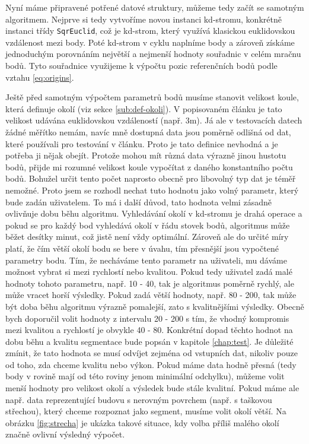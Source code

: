 \documentclass[11pt,twoside,a4paper]{book}
\begin{document}
Nyní máme připravené potřené datové struktury, můžeme tedy začít se samotným algoritmem. Nejprve si tedy vytvoříme novou instanci kd-stromu, konkrétně instanci třídy \verb|SqrEuclid|, což je kd-strom, který využívá klasickou euklidovskou vzdálenost mezi body. Poté kd-strom  v cyklu naplníme body a zároveň získáme jednoduchým porovnáním  největší a nejmenší hodnoty souřadnic v celém mračnu bodů. Tyto souřadnice využijeme k výpočtu pozic referenčních bodů podle vztahu \ref{eq:origins}.

Ještě před samotným výpočtem parametrů bodů musíme stanovit velikost koule, která definuje okolí (viz sekce \ref{sub:def-okoli}). V popisovaném článku je tato velikost udávána euklidovskou vzdáleností (např. 3m). Já ale v testovacích datech žádné měřítko nemám, navíc mně dostupná data jsou poměrně odlišná od dat, které používali pro testování v článku. Proto je tato definice nevhodná a je potřeba ji nějak obejít. Protože mohou mít různá data výrazně jinou hustotu bodů, přijde mi rozumné velikost koule vypočítat z daného konstantního počtu bodů. Bohužel určit tento počet naprosto obecně pro libovolný typ dat je téměř nemožné. Proto jsem se rozhodl nechat tuto hodnotu jako volný parametr, který bude zadán uživatelem. To má i další důvod, tato hodnota velmi zásadně ovlivňuje dobu běhu algoritmu. Vyhledávání okolí v kd-stromu je drahá operace a pokud se pro každý bod vyhledává okolí v řádu stovek bodů, algoritmus může běžet desítky minut, což jistě není vždy optimální. Zároveň ale do určité míry platí, že čím větší okolí bodu se bere v úvahu, tím přesnější jsou vypočtené parametry bodu. Tím, že necháváme tento parametr na uživateli, mu dáváme možnost vybrat si mezi rychlostí nebo kvalitou. Pokud tedy uživatel zadá malé hodnoty tohoto parametru, např. 10 - 40, tak je algoritmus poměrně rychlý, ale může vracet horší výsledky. Pokud zadá větší hodnoty, např. 80 - 200, tak může být doba běhu algoritmu výrazně pomalejší, zato s kvalitnějšími výsledky. Obecně bych doporučil volit hodnoty z intervalu 20 - 200 s tím, že vhodný kompromis mezi kvalitou a rychlostí je obvykle 40 - 80. Konkrétní dopad těchto hodnot na dobu běhu a kvalitu segmentace bude popsán v kapitole \ref{chap:test}. Je důležité zmínit, že tato hodnota se musí odvíjet zejména od vstupních dat, nikoliv pouze od toho, zda chceme kvalitu nebo výkon. Pokud máme data hodně přesná (tedy body v rovině mají od této roviny jenom minimální odchylku), můžeme volit menší hodnoty pro velikost okolí a výsledek bude stále kvalitní. Pokud máme ale např. data reprezentující budovu s nerovným povrchem (např. s taškovou střechou), který chceme rozpoznat jako segment, musíme volit okolí větší. Na obrázku \ref{fig:strecha} je ukázka takové situace, kdy volba příliš malého okolí značně ovlivní výsledný výpočet.
\end{document}
